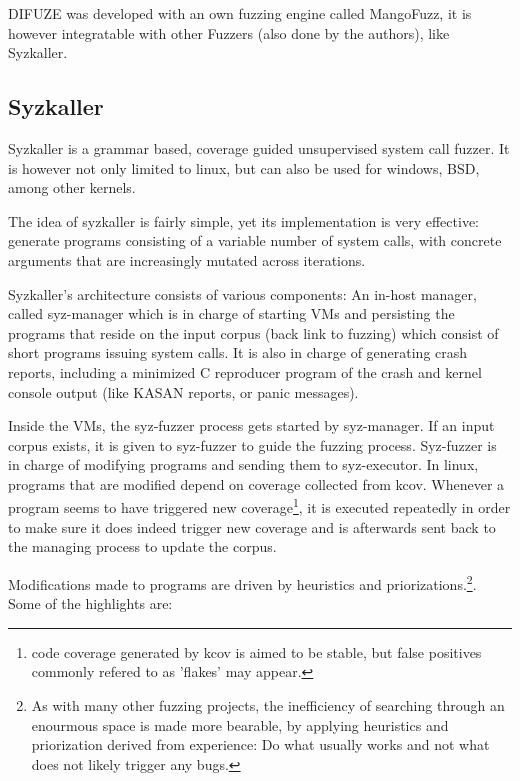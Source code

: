 DIFUZE was developed with an own fuzzing engine called MangoFuzz, it is however integratable with other Fuzzers (also done by the authors), like Syzkaller.



\subsection{Syzkaller}

Syzkaller is a grammar based, coverage guided unsupervised
system call fuzzer. It is however not only
limited to linux, but can also be used for windows, BSD, among other
kernels.

The idea of syzkaller is fairly simple, yet its implementation is very effective: generate programs consisting of a variable number of system calls, with
concrete arguments that are increasingly mutated across iterations.


Syzkaller's architecture consists of various components: An in-host manager, called
syz-manager which is in charge of starting VMs and persisting the programs that
reside on the input corpus (back link to fuzzing) which consist of short programs issuing
system calls. It is also in charge of generating crash reports, including a minimized C reproducer program of the crash and kernel console output (like KASAN reports, or panic
messages).

Inside the VMs, the syz-fuzzer process gets started by syz-manager. If an input
corpus exists, it is given to syz-fuzzer to guide the fuzzing process. Syz-fuzzer is
in charge of modifying programs and sending them to syz-executor. In linux, programs that
are modified depend on coverage collected from kcov. Whenever a program seems to have triggered new coverage\footnote{code coverage generated by kcov is aimed to be stable, but false positives commonly refered to as 'flakes' may appear.},
it is executed repeatedly in order to make sure it does indeed trigger new coverage and is
afterwards sent back to the managing process to update the corpus.

Modifications made to programs are driven by heuristics and priorizations.\footnote{As with many other fuzzing projects, the inefficiency of searching through an enourmous space is made more bearable, by applying heuristics and priorization derived from experience: Do what usually works and not what does not likely trigger any bugs.}. Some of the highlights are\cite{vyukovSyzkallerAdventuresContinuous2020}:

